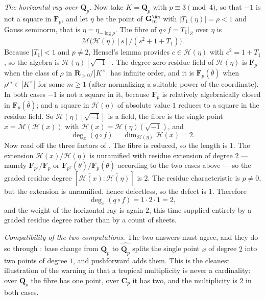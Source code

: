 \begin{example}
\emph{The horizontal ray over $\mathbf Q_p$.} Now take $K=\mathbf Q_p$ with
$p\equiv3\pmod4$, so that $-1$ is not a square in $\mathbf F_p$, and let
$\eta$ be the point of $\mathbf G_m^{\An}$ with $|T_1(\eta)|=\rho<1$ and
Gauss seminorm, that is $\eta=\eta_{-\log\rho}$. The fibre of
$q\circ f=T_1|_Z$ over $\eta$ is
\[
 \mathcal M\bigl(\mathcal H(\eta)[s]/(s^2+1+T_1)\bigr).
\]
Because $|T_1|<1$ and $p\ne2$, Hensel's lemma provides
$c\in\mathcal H(\eta)$ with $c^2=1+T_1$, so the algebra is
$\mathcal H(\eta)[\sqrt{-1}]$. The degree-zero residue field of
$\mathcal H(\eta)$ is $\mathbf F_p$ when the class of $\rho$ in
$\mathbf R_{>0}/|K^\times|$ has infinite order, and it is
$\mathbf F_p(\bar\theta)$ when $\rho^m\in|K^\times|$ for some $m\ge1$ (after
normalizing a suitable power of the coordinate). In both cases $-1$ is not a
square in it, because $\mathbf F_p$ is relatively algebraically closed in
$\mathbf F_p(\bar\theta)$; and a square
in $\mathcal H(\eta)$ of absolute value $1$ reduces to a square in the
residue field. So $\mathcal H(\eta)[\sqrt{-1}]$ is a field, the fibre is the
single point $x=\mathcal M(\mathcal H(x))$ with
$\mathcal H(x)=\mathcal H(\eta)(\sqrt{-1})$, and
\[
 \deg_x(q\circ f)=\dim_{\mathcal H(\eta)}\mathcal H(x)=2 .
\]
Now read off the three factors of . The fibre is
reduced, so the length is $1$. The extension
$\mathcal H(x)/\mathcal H(\eta)$ is unramified with residue extension of
degree $2$ --- namely $\mathbf F_{p^2}/\mathbf F_p$ or
$\mathbf F_{p^2}(\bar\theta)/\mathbf F_p(\bar\theta)$ according to the two
cases above --- so the graded residue degree
$[\widetilde{\mathcal H(x)}:\widetilde{\mathcal H(\eta)}]$ is $2$. The
residue characteristic is $p\ne0$, but the extension is unramified, hence
defectless, so the defect is $1$. Therefore
\[
 \deg_x(q\circ f)=1\cdot2\cdot1=2,
\]
and the weight of the horizontal ray is again $2$, this time supplied
entirely by a graded residue degree rather than by a count of sheets.

\emph{Compatibility of the two computations.} The two answers must agree,
and they do so through
: base change from $\mathbf Q_p$ to
$\widehat{\overline{\mathbf Q_p}}$ splits the single point $x$ of degree $2$
into two points of degree $1$, and pushforward adds them. This is the
cleanest illustration of the warning in
 that a tropical multiplicity is never
a cardinality: over $\mathbf Q_p$ the fibre has one point, over
$\mathbf C_p$ it has two, and the multiplicity is $2$ in both cases.
\end{example}

